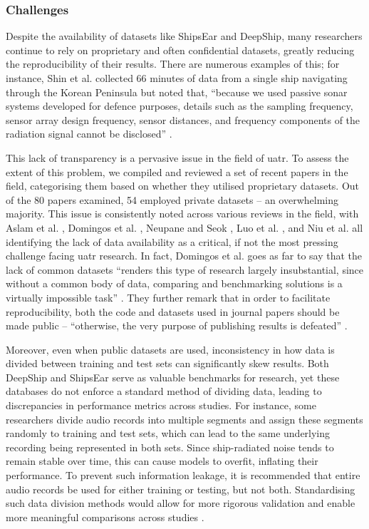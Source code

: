 \subsubsection{Challenges}

Despite the availability of datasets like ShipsEar and DeepShip, many researchers continue to rely on proprietary and often confidential datasets, greatly reducing the reproducibility of their results. There are numerous examples of this; for instance, Shin et al. collected 66 minutes of data from a single ship navigating through the Korean Peninsula but noted that, ``because we used passive sonar systems developed for defence purposes, details such as the sampling frequency, sensor array design frequency, sensor distances, and frequency components of the radiation signal cannot be disclosed'' \cite[8]{shin_passive_2022}. 

This lack of transparency is a pervasive issue in the field of \acrshort{uatr}. To assess the extent of this problem, we compiled and reviewed a set of recent papers in the field, categorising them based on whether they utilised proprietary datasets. Out of the 80 papers examined, 54 employed private datasets -- an overwhelming majority. This issue is consistently noted across various reviews in the field, with Aslam et al. \cite[16]{aslam_underwater_2024}, Domingos et al. \cite[24]{domingos_survey_2022}, Neupane and Seok \cite[24]{neupane_review_2020}, Luo et al. \cite[12]{luo_survey_2023}, and Niu et al. \cite[19]{niu_advances_2023} all identifying the lack of data availability as a critical, if not the most pressing challenge facing \acrshort{uatr} research. In fact, Domingos et al. goes as far to say that the lack of common datasets ``renders this type of research largely insubstantial, since without a common body of data, comparing and benchmarking solutions is a virtually impossible task'' \cite[24]{domingos_survey_2022}. They further remark that in order to facilitate reproducibility, both the code and datasets used in journal papers should be made public -- ``otherwise, the very purpose of publishing results is defeated'' \cite[24]{domingos_survey_2022}.

Moreover, even when public datasets are used, inconsistency in how data is divided between training and test sets can significantly skew results. Both DeepShip and ShipsEar serve as valuable benchmarks for research, yet these databases do not enforce a standard method of dividing data, leading to discrepancies in performance metrics across studies. For instance, some researchers divide audio records into multiple segments and assign these segments randomly to training and test sets, which can lead to the same underlying recording being represented in both sets. Since ship-radiated noise tends to remain stable over time, this can cause models to overfit, inflating their performance. To prevent such information leakage, it is recommended that entire audio records be used for either training or testing, but not both. Standardising such data division methods would allow for more rigorous validation and enable more meaningful comparisons across studies \cite{niu_advances_2023}.